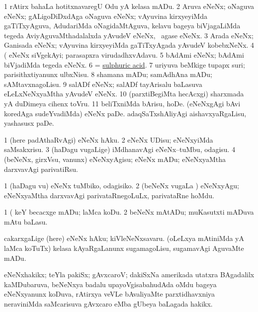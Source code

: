 \noindent
\gl{\pagu}
\bmng
{} 
\bnum
\num{1}  rAtirx bahaLa hotitxnavaregU Odu yA kelasa mADu. 
\num{2}  Aruva eNeNx; oNaguva eNeNx; gALigoDiDxdAga oNaguva eNeNx; vAyuvina kirxyeyiMda gaTiTxyAguva, AdudariMda oNagidaMtAguva, kelavu bageya biVjagaLiMda tegeda AviyAguvaMthadalalxda yAvudeV eNeNx, \udA\ agase eNeNx. 
\num{3}  Arada eNeNx; Ganisada eNeNx; vAyuvina kirxyeyiMda gaTiTxyAgada yAvudeV kobebxNeNx. 
\num{4}  (  eNeNx siVgekAyi; parasapxra virudadhxvAdavu. 
\num{5}  bAdAmi eNeNx; bAdAmi biVjadiMda tegeda eNeNx. 
\num{6}  = \hyperref{kandict_s.pdf}{S}{sulphuric acid}{sulphuric acid}. 
\num{7}  uriyuva beMkige tupapx suri; parisithxtiyanunx ulbxNisu. 
\num{8}  shamana mADu; samAdhAna mADu; sAMtavxnagoLisu. 
\num{9}  salADf eNeNx; salADf tayArisalu baLasuva eLeLxNeNxyaMtha yAvudeV eNeNx. 
\num{10}  (parxtiBegiMta hecAcxgi) sharxmada yA duDimeya cihenx toVru. 
\num{11}  beliTxniMda bArisu, hoDe. 
  
\banum
{} (eNeNxgAgi bAvi koredAga sudeYvadiMda) eNeNx paDe. 
 adaqSaTxshAliyAgi aishavxyaRgaLisu, yashasusx paDe. 
\eanum
\numie
\enum
\emng
\eentry

\bentry
{}
\gl{\sakirx}
\bmng
\bnum
\num{1} (here padAthaRvAgi) eNeNx hAku. 
\num{2} eNeNx UDisu; eNeNxyiMda saMsakxrisu. 
\num{3} (haDagu \mo vugaLige) iMdhanavAgi eNeNx--tuMbu, odagisu. 
\num{4} (beNeNx, girxVsu, \mo vanunx) eNeNxyAgisu; eNeNx mADu; eNeNxyaMtha darxvavAgi parivatiRsu. 
\enum
\emng

\noindent
\gl{\akirx}
\bmng
\bnum
\num{1} (haDagu \mo vu) eNeNx tuMbiko, odagisiko. 
\num{2} (beNeNx \mo vugaLa \vi) eNeNxyAgu; eNeNxyaMtha darxvavAgi parivataRnegoLuLx, parivataRne hoMdu. 
\enum
\emng

\noindent
\gl{\pagu}
\bmng
\bnum
\num{1}  (  keY becacxge mADu; laMca koDu. 
\num{2}  beNeNx mAtADu; muKasutxti mADuva mAtu baLasu. 
  
\banum
{} cakarxgaLige (here) eNeNx hAku; kiVleNeNxsavaru. 
 (oLeLxya mAtiniMda yA laMca koTuTx) kelasa kAyaRgaLanunx sugamagoLisu, sugamavAgi AguvaMte mADu. 
\eanum
\numie
\enum
\emng
\eentry

\bentry
{}
\gl{\nA}
\bmng
eNeNxhakikx; teYla pakiSx; gAvxcaroV; dakiSxNa amerikada utatxra BAgadalilx kaMDubaruva, beNeNxya badalu upayoVgisabahudAda oMdu bageya eNeNxyanunx koDuva, rAtirxya veVLe bAvaliyaMte parxtidhavxniya neraviniMda saMcarisuva gAvxcaro eMba gUbeya baLagada hakikx. 
\emng
\eentry

